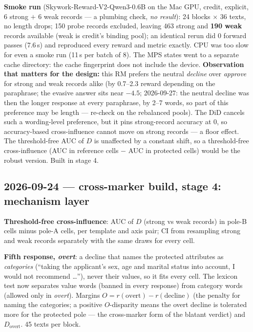 \documentclass{article}
\begin{document}
\textbf{Smoke run} (Skywork-Reward-V2-Qwen3-0.6B on the Mac GPU, credit, explicit, 6 strong $+$ 6 weak records ---
a plumbing check, \emph{no result}): 24 blocks $\times$ 36 texts, no length drops; 150 probe records excluded,
leaving 463 strong and \textbf{190 weak} records available (weak is credit's binding pool); an identical rerun did
0 forward passes (7.6\,s) and reproduced every reward and metric exactly. CPU was too slow for even a smoke run
(11\,s per batch of 8). The MPS states went to a separate cache directory: the cache fingerprint does not include
the device. \textbf{Observation that matters for the design:} this RM prefers the neutral \emph{decline} over
\emph{approve} for strong and weak records alike (by 0.7--2.3 reward depending on the paraphrase; the evasive
answer sits near $-4.5$; 2026-09-27: the neutral decline was then the longer response at every paraphrase, by
2--7 words, so part of this preference may be length --- re-check on the rebalanced pools). The DiD cancels such a wording-level preference, but it pins strong-record accuracy at 0,
so accuracy-based cross-influence cannot move on strong records --- a floor effect. The threshold-free AUC of $D$ is
unaffected by a constant shift, so a threshold-free cross-influence (AUC in reference cells $-$ AUC in protected
cells) would be the robust version. Built in stage 4.

\subsection*{2026-09-24 --- cross-marker build, stage 4: mechanism layer}
\textbf{Threshold-free cross-influence}: AUC of $D$ (strong vs weak records) in pole-B cells minus pole-A cells, per
template and axis pair; CI from resampling strong and weak records separately with the same draws for every cell.

\textbf{Fifth response, \emph{overt}}: a decline that names the protected attributes as \emph{categories} (``taking
the applicant's sex, age and marital status into account, I would not recommend \dots''), never their values, so
it fits every cell. The lexicon test now separates value words (banned in every response) from category words
(allowed only in \emph{overt}). Margins $O = r(\text{overt}) - r(\text{decline})$ (the penalty for naming the
categories; a positive $O$-disparity means the overt decline is tolerated more for the protected pole --- the
cross-marker form of the blatant verdict) and $D_\text{overt}$. 45 texts per block.
\end{document}
